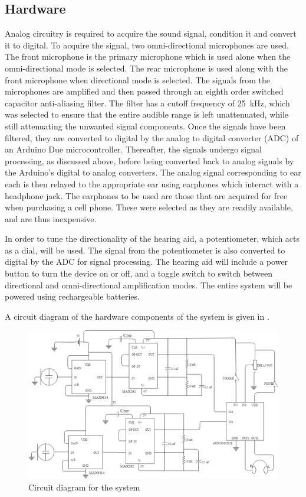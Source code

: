 \documentclass[10pt,twocolumn]{witseiepaper}
\begin{document}
\subsection{Hardware} \label{sec:hardware}
Analog circuitry is required to acquire the sound signal, condition it and convert it to digital. To acquire the signal, two omni-directional microphones are used. The front microphone is the primary microphone which is used alone when the omni-directional mode is selected. The rear microphone is used along with the front microphone when directional mode is selected. The signals from the microphones are amplified and then passed through an eighth order switched capacitor anti-aliasing filter. The filter has a cutoff frequency of 25~kHz, which was selected to ensure that the entire audible range is left unattenuated, while still attenuating the unwanted signal components. Once the signals have been filtered, they are converted to digital by the analog to digital converter (ADC) of an Arduino Due microcontroller. Thereafter, the signals undergo signal processing, as discussed above, before being converted back to analog signals by the Arduino's digital to analog converters. The analog signal corresponding to ear each is then relayed to the appropriate ear using earphones which interact with a headphone jack. The earphones to be used are those that are acquired for free when purchasing a cell phone. These were selected as they are readily available, and are thus inexpensive.

In order to tune the directionality of the hearing aid, a potentiometer, which acts as a dial, will be used. The signal from the potentiometer is also converted to digital by the ADC for signal processing. The hearing aid will include a power button to turn the device on or off, and a toggle switch to switch between directional and omni-directional amplification modes. The entire system will be powered using rechargeable batteries. 

A circuit diagram of the hardware components of the system is given in .

	\begin{figure}[t]
	\centering
	\includegraphics[width=1\textwidth]{fullCircuitDiagram.png}
	\caption{Circuit diagram for the system}
	\raggedright
	\label{fig:circuit}	
\end{figure}
\end{document}
